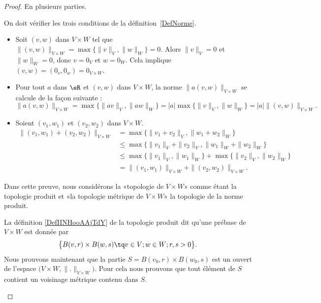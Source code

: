 \begin{proof}
	En plusieurs parties.
	\begin{subproof}
		\spitem[Norme]
		On doit vérifier les trois conditions de la définition~\ref{DefNorme}.
		\begin{itemize}
			\item Soit \( (v,w)\) dans \( V\times W\) tel que \( \|(v,w)\|_{V\times W}=\max\{\|v\|_{V},\|w\|_W\}=0\). Alors \( \|v\|_V=0\) et \( \|w\|_W=0\), donc \( v=0_V\) et \( w=0_W\). Cela implique \( (v,w)=(0_v,0_w)=0_{V\times W}\).
			\item Pour tout \( a\) dans \( \eR\) et \( (v,w)\) dans \( V\times W\), la norme \( \|a (v,w)\|_{V\times W}\) se calcule de la façon suivante :
			      \begin{equation}
				      \|a (v,w)\|_{V\times W}= \max\{ \| av \|_V,\| aw \|_W \} =|a|\max\{\|v\|_{V},\|w\|_W\}=|a|\|(v,w)\|_{V\times W}.
			      \end{equation}
			\item Soient \( (v_1,w_1)\) et \( (v_2,w_2)\) dans \( V\times W\).
			      \begin{equation}
				      \begin{aligned}
					      \|(v_1,w_1)+(v_2,w_2)\|_{V\times W} & =\max\{\|v_1+v_2\|_{V},\|w_1+w_2\|_W\}                         \\
					                                          & \leq \max\{\|v_1\|_V+\|v_2\|_{V},\|w_1\|_W+\|w_2\|_W\}         \\
					                                          & \leq\max\{\|v_1\|_V,\|w_1\|_W\}+ \max\{\|v_2\|_{V},\|w_2\|_W\} \\
					                                          & =\|(v_1,w_1)\|_{V\times W}+\|(v_2,w_2)\|_{V\times W}.
				      \end{aligned}
			      \end{equation}
		\end{itemize}

		\spitem[Équivalence]

		Dans cette preuve, nous considérons la «topologie de \( V\times W\)» comme étant la topologie produit et «la topologie métrique de \( V\times W\)» la topologie de la norme produit.

		\begin{subproof}
			La définition \ref{DefIINHooAAjTdY} de la topologie produit dit qu'une prébase de \( V\times W\) est donnée par
			\begin{equation}
				\big\{   B(v,r)\times B(w,s)\tq v\in V;w\in W;r,s>0   \big\}.
			\end{equation}
			Nous prouvons maintenant que la partie \( S= B(v_0,r)\times B(w_0,s)\) est un ouvert de l'espace \( \big( V\times W,\| . \|_{V\times W} \big)\). Pour cela nous prouvons que tout élément de \( S\) contient un voisinage métrique contenu dans \( S\).


\end{subproof}
\end{subproof}
\end{proof}
